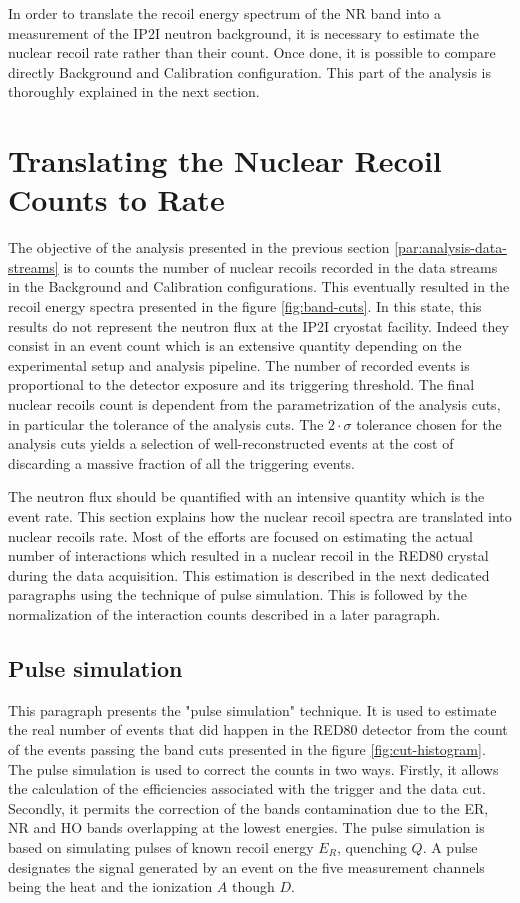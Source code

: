 In order to translate the recoil energy spectrum of the NR band into a measurement of the IP2I neutron background, it is necessary to estimate the nuclear recoil rate rather than their count. Once done, it is possible to compare directly Background and Calibration configuration. This part of the analysis is thoroughly explained in the next section.


\section{Translating the Nuclear Recoil Counts to Rate}

The objective of the analysis presented in the previous section \ref{par:analysis-data-streams} is to counts the number of nuclear recoils recorded in the data streams in the Background and Calibration configurations. This eventually resulted in the recoil energy spectra presented in the figure \ref{fig:band-cuts}. In this state, this results do not represent the neutron flux at the IP2I cryostat facility. 
Indeed they consist in an event count which is an extensive quantity depending on the experimental setup and analysis pipeline. The number of recorded events is proportional to the detector exposure and its triggering threshold. The final nuclear recoils count is dependent from the parametrization of the analysis cuts, in particular the tolerance of the analysis cuts. The $2 \cdot \sigma$ tolerance chosen for the analysis cuts yields a selection of well-reconstructed events at the cost of discarding a massive fraction of all the triggering events. 

The neutron flux should be quantified with an intensive quantity which is the event rate. This section explains how the nuclear recoil spectra are translated into nuclear recoils rate. 
Most of the efforts are focused on estimating the actual number of interactions which resulted in a nuclear recoil in the RED80 crystal during the data acquisition. This estimation is described in the next dedicated paragraphs using the technique of pulse simulation.
This is followed by the normalization of the interaction counts described in a later paragraph.


\subsection{Pulse simulation}
\label{par:pulse-simulation}

This paragraph presents the "pulse simulation" technique. It is used to estimate the real number of events that did happen in the RED80 detector from the count of the events passing the band cuts presented in the figure \ref{fig:cut-histogram}. The pulse simulation is used to correct the counts in two ways. 
Firstly, it allows the calculation of the efficiencies associated with the trigger and the data cut. Secondly, it permits the correction of the bands contamination due to the ER, NR and HO bands overlapping at the lowest energies.
The pulse simulation is based on simulating pulses of known recoil energy $E_R$, quenching $Q$. A pulse designates the signal generated by an event on the five measurement channels being the heat and the ionization $A$ though $D$.

